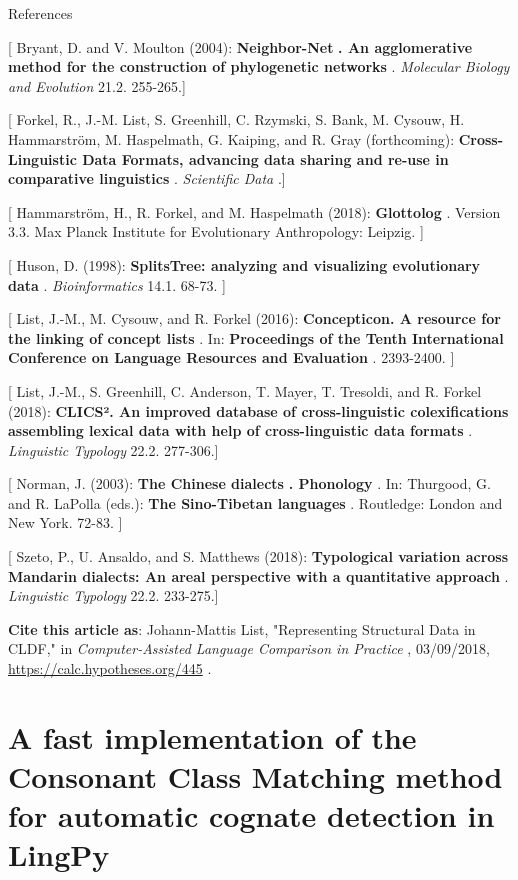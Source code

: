 \documentclass[
  english,
  a4paper,
  oneside,tablecaptionabove
]{scrbook}
\begin{document}
References

{[} Bryant, D. and V. Moulton (2004): \textbf{Neighbor-Net} \textbf{. An
agglomerative method for the construction of phylogenetic networks} .
\emph{Molecular Biology and Evolution} 21.2. 255-265.{]}

{[} Forkel, R., J.-M. List, S. Greenhill, C. Rzymski, S. Bank, M.
Cysouw, H. Hammarström, M. Haspelmath, G. Kaiping, and R. Gray
(forthcoming): \textbf{Cross-Linguistic Data Formats, advancing data
sharing and re-use in comparative linguistics} . \emph{Scientific Data}
.{]}

{[} Hammarström, H., R. Forkel, and M. Haspelmath (2018):
\textbf{Glottolog} . Version 3.3. Max Planck Institute for Evolutionary
Anthropology: Leipzig. {]}

{[} Huson, D. (1998): \textbf{SplitsTree: analyzing and visualizing
evolutionary data} . \emph{Bioinformatics} 14.1. 68-73. {]}

{[} List, J.-M., M. Cysouw, and R. Forkel (2016): \textbf{Concepticon. A
resource for the linking of concept lists} . In: \textbf{Proceedings of
the Tenth International Conference on Language Resources and Evaluation}
. 2393-2400. {]}

{[} List, J.-M., S. Greenhill, C. Anderson, T. Mayer, T. Tresoldi, and
R. Forkel (2018): \textbf{CLICS². An improved database of
cross-linguistic colexifications assembling lexical data with help of
cross-linguistic data formats} . \emph{Linguistic Typology} 22.2.
277-306.{]}

{[} Norman, J. (2003): \textbf{The Chinese dialects} \textbf{.
Phonology} . In: Thurgood, G. and R. LaPolla (eds.): \textbf{The
Sino-Tibetan languages} . Routledge: London and New York. 72-83. {]}

{[} Szeto, P., U. Ansaldo, and S. Matthews (2018): \textbf{Typological
variation across Mandarin dialects: An areal perspective with a
quantitative approach} . \emph{Linguistic Typology} 22.2. 233-275.{]}

\textbf{Cite this article as}: Johann-Mattis List, "Representing
Structural Data in CLDF," in \emph{Computer-Assisted Language Comparison
in Practice} , 03/09/2018, \url{https://calc.hypotheses.org/445} .

\hypertarget{a-fast-implementation-of-the-consonant-class-matching-method-for-automatic-cognate-detection-in-lingpy}{%
\chapter{A fast implementation of the Consonant Class Matching method
for automatic cognate detection in
LingPy}\label{a-fast-implementation-of-the-consonant-class-matching-method-for-automatic-cognate-detection-in-lingpy}}
\end{document}
